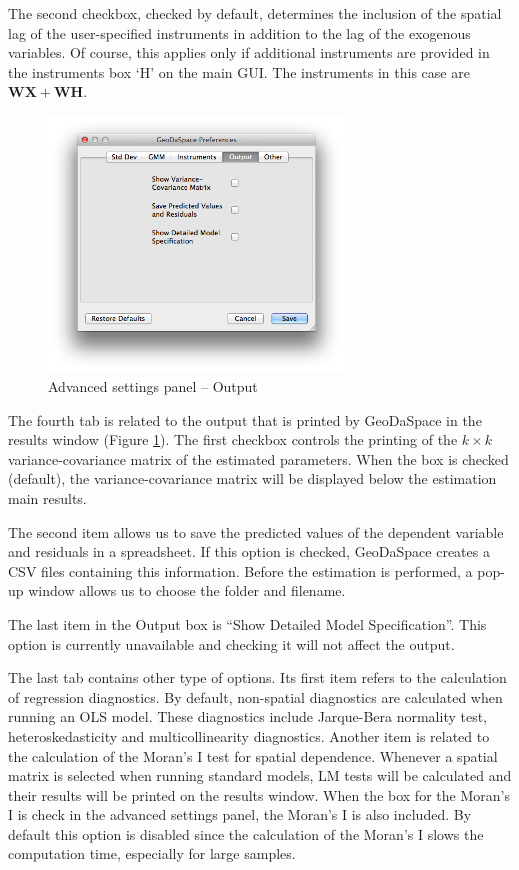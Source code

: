 \documentclass{article}
\begin{document}
The second checkbox, checked by default, determines the inclusion of the spatial lag of the user-specified instruments in addition to the lag of the exogenous variables. Of course, this applies only if additional instruments are provided in the instruments box `H' on the main GUI. The instruments in this case are $\mathbf{WX} + \mathbf{WH}$.
\FloatBarrier

\begin{figure}[htb]
\centering
\includegraphics[width=0.7\textwidth]{adv_out.png}
\caption{Advanced settings panel -- Output}
\label{f:adv_out}
\end{figure}
\FloatBarrier

The fourth tab is related to the output that is printed by GeoDaSpace in the results window (Figure \ref{f:adv_out}).  The first checkbox controls the printing of the $k \times k$ variance-covariance matrix of the estimated parameters. When the box is checked (default), the variance-covariance matrix will be displayed below the estimation main results.

The second item allows us to save the predicted values of the dependent variable and residuals in a spreadsheet. If this option is checked, GeoDaSpace creates a CSV files containing this information. Before the estimation is performed, a pop-up window allows us to choose the folder and filename.

The last item in the Output box is ``Show Detailed Model Specification''. This option is currently unavailable and checking it will not affect the output.

The last tab contains other type of options. Its first item refers to the calculation of regression diagnostics. By default, non-spatial diagnostics are calculated when running an OLS model. These diagnostics include Jarque-Bera normality test, heteroskedasticity and multicollinearity diagnostics. Another item is related to the calculation of the Moran's I test for spatial dependence. Whenever a spatial matrix is selected when running standard models, LM tests will be calculated and their results will be printed on the results window. When the box for the Moran's I is check in the advanced settings panel, the Moran's I is also included. By default this option is disabled since the calculation of the Moran's I slows the computation time, especially for large samples.
\end{document}
